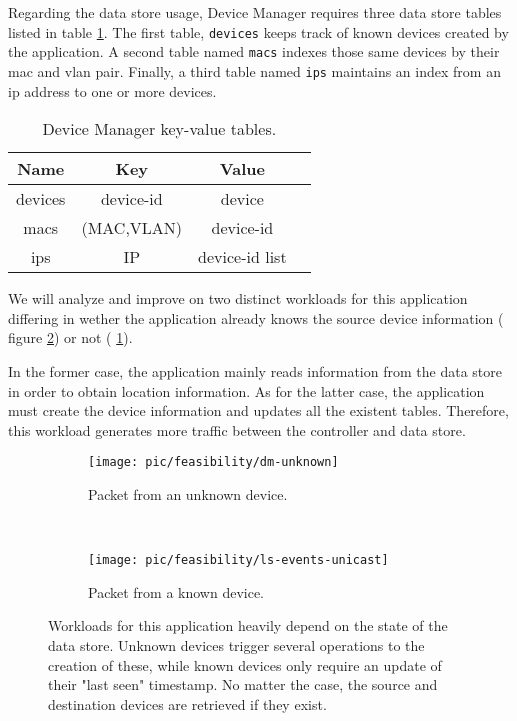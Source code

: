 Regarding the data store usage, Device Manager requires three
data store tables listed in table \ref{table:dm:indexes}.  The first
table, \texttt{devices} keeps track of known devices created by the
application. A second table named \texttt{macs}  indexes those same devices by their
\gls{mac} and \gls{vlan}  pair.  Finally, a third table named
\texttt{ips} maintains an index from an \gls{ip} address to one or
more devices.


\begin{table}
\small
\begin{tabular}{cccc}
Name & Key & Value & \\ \toprule
devices & device-id &  device \\\midrule
macs & (MAC,VLAN)  & device-id   \\\midrule
ips  & IP & device-id list \\\midrule
\end{tabular}
\caption[Device Manager key-value tables]{Device Manager key-value tables.}
\label{table:dm:indexes}
\end{table}

We will analyze and improve on  two distinct workloads for this application differing in
wether the application already knows the source device information (
figure \ref{fig:dm:interaction:known})
or not ( \ref{fig:dm:interaction:unknown}). 

In the former case, the
application mainly reads information from the data store in order to
obtain location information. As for the latter case, the
application must create the device information and updates all the
existent tables. Therefore, this workload generates more traffic between
the controller and data store. 


\begin{figure}
  \centering
  \begin{subfigure}[b]{0.5\textwidth}
                \centering
                \texttt{[image: pic/feasibility/dm-unknown]}
                \caption{Packet from an unknown device.}
                \label{fig:dm:interaction:unknown}
        \end{subfigure}%
        ~
        \begin{subfigure}[b]{0.5\textwidth}
                \centering
                \texttt{[image: pic/feasibility/ls-events-unicast]}
                \caption{Packet from a known device.}
                \label{fig:dm:interaction:known}
        \end{subfigure}
        \caption[Device Manager workload events]{Workloads for this application heavily depend on the state of the data store. Unknown devices trigger several operations to the creation of these, while known devices only require an update of their "last seen" timestamp. No matter the case, the source and destination devices are retrieved if they exist.}
        \label{fig:dm:interaction}
\end{figure}

